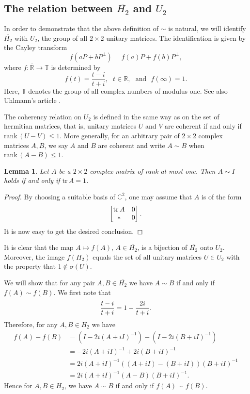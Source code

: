 \documentclass[10pt]{amsart}
\newtheorem{lemma}[theorem]{Lemma}
\theoremstyle{definition}
\theoremstyle{remark}
\numberwithin{subsection}{section}
\numberwithin{equation}{section}
\newcommand\oH{{\overline{H_2}}}
\newcommand\oR{{\overline{\mathbb{R}}}}
\begin{document}
\subsection{The relation between $\oH$ and $U_2$}\label{oHU2}
In order to demonstrate that the above definition of $\sim$ is natural, we will identify $\oH$ with $U_2$, the group of all $2 \times 2$ unitary matrices. The identification is given by the Cayley transform 
\begin{equation}\label{cayley}
f(aP+bP^{\perp}) = f(a)P+f(b)P^{\perp},
\end{equation}
 where $f\colon {\oR}\to\mathbb{T}$ is determined by 
\begin{equation}\label{cayleyf}
 f(t)=\frac{t-i}{t+i}, \ \ \ t\in \mathbb{R},\ \ \  \text{and}\ \ \ f(\infty)=1.
\end{equation}
Here, $\mathbb{T}$  denotes the group of all complex numbers of modulus one.
See also Uhlmann's article \cite{Uh}.

The coherency relation on $U_2$ is defined in the same way as on the set of hermitian matrices, that is, unitary matrices $U$ and $V$ are coherent if and only if $\mathrm{rank}\, (U-V) \le 1$. 
More generally, for an arbitrary pair of $2\times 2$ complex matrices $A, B$, we say $A$ and $B$ are coherent and write $A\sim B$  when $\mathrm{rank}\, (A-B) \le 1$.

\begin{lemma}\label{tr1}
Let $A$ be a $2\times 2$ complex matrix of rank at most one.
Then $A\sim I$ holds if and only if $\mathrm{tr}\, A=1$. 
\end{lemma}
\begin{proof}
By choosing a suitable basis of $\mathbb{C}^2$, one may assume that $A$ is of the form
\[
\left[ \begin{matrix} \mathrm{tr}\,A  & 0  \cr * & 0 \cr \end{matrix} \right]. 
\]
It is now easy to get the desired conclusion.
\end{proof}
It is clear that the map $A \mapsto f(A)$, $A \in \oH$, is a bijection of $\oH$ onto $U_2$. 
Moreover, the image $f(H_2)$ equals 
the set of all unitary matrices $U \in U_2$ with the property that $1 \not\in \sigma (U)$.

We will show that for any pair $A,B \in \oH$ we have $A \sim B$ if and only if $f(A) \sim f(B)$. We first note that
\begin{equation}\label{mmmm}
{t-i \over t+i} = 1 - {2i \over t+i}.
\end{equation}
Therefore, for any  $A,B \in H_2$ we have
\[
\begin{split}
f(A) - f(B) &= \left( I - 2i(A+iI)^{-1} \right) -  \left( I-2i(B+iI)^{-1} \right)\\
&=-2i(A+iI)^{-1} + 2i(B+iI)^{-1} \\
&= 2i(A+iI)^{-1} ((A+iI)-(B+iI))(B+iI)^{-1}\\
&= 2i(A+iI)^{-1} (A-B) (B+iI)^{-1}.
\end{split}
\]
Hence for  $A,B \in H_2$, we have $A \sim B$ if and only if $f(A) \sim f(B)$. 
\end{document}
